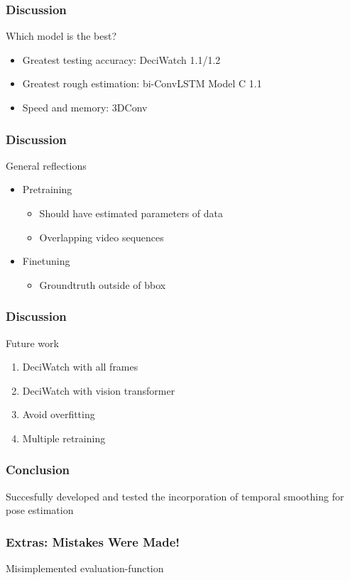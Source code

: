 \documentclass{beamer}
\begin{document}
\begin{frame}
    \frametitle{Discussion}
    Which model is the best?
    \begin{itemize}
        \item<1-> Greatest testing accuracy: DeciWatch 1.1/1.2
        \item<2-> Greatest rough estimation: bi-ConvLSTM Model C 1.1
        \item<3-> Speed and memory: 3DConv
    \end{itemize}
\end{frame}

\begin{frame}
    \frametitle{Discussion}
    General reflections
    \begin{itemize}
        \item<1-> Pretraining
        \begin{itemize}
            \item<1-> Should have estimated parameters of data
            \item<2-> Overlapping video sequences
        \end{itemize}
        \item<3-> Finetuning
        \begin{itemize}
            \item<3-> Groundtruth outside of bbox 
        \end{itemize}
    \end{itemize}
\end{frame}

\begin{frame}
    \frametitle{Discussion}
    Future work
    \begin{enumerate}
        \item<1-> DeciWatch with all frames
        \item<2-> DeciWatch with vision transformer
        \item<3-> Avoid overfitting
        \item<4-> Multiple retraining
    \end{enumerate}
\end{frame}

\begin{frame}
    \frametitle{Conclusion}
    Succesfully developed and tested the incorporation of temporal smoothing for pose estimation
\end{frame}

\begin{frame}
    \frametitle{Extras: Mistakes Were Made!}
    Misimplemented evaluation-function
\end{frame}
\end{document}
